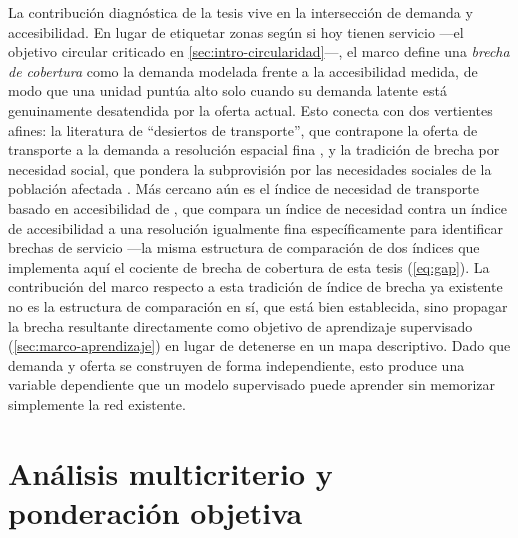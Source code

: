 La contribución diagnóstica de la tesis vive en la intersección de demanda y
accesibilidad. En lugar de etiquetar zonas según si hoy tienen servicio ---el objetivo
circular criticado en \cref{sec:intro-circularidad}---, el marco define una \emph{brecha de
cobertura} como la demanda modelada frente a la accesibilidad medida, de modo que una
unidad puntúa alto solo cuando su demanda latente está genuinamente desatendida por la
oferta actual. Esto conecta con dos vertientes afines: la literatura de ``desiertos de
transporte'', que contrapone la oferta de transporte a la demanda a resolución espacial
fina \parencite{jiao2013deserts}, y la tradición de brecha por necesidad social, que
pondera la subprovisión por las necesidades sociales de la población afectada
\parencite{currie2010gaps}. Más cercano aún es el índice de necesidad de transporte basado
en accesibilidad de \textcite{almamun2011servicegaps}, que compara un índice de necesidad
contra un índice de accesibilidad a una resolución igualmente fina específicamente para
identificar brechas de servicio ---la misma estructura de comparación de dos índices que
implementa aquí el cociente de brecha de cobertura de esta tesis (\cref{eq:gap}). La
contribución del marco respecto a esta tradición de índice de brecha ya existente no es la
estructura de comparación en sí, que está bien establecida, sino propagar la brecha
resultante directamente como objetivo de aprendizaje supervisado (\cref{sec:marco-aprendizaje})
en lugar de detenerse en un mapa descriptivo. Dado que demanda y oferta se construyen de
forma independiente, esto produce una variable dependiente que un modelo supervisado puede
aprender sin memorizar simplemente la red existente.

\section{Análisis multicriterio y ponderación objetiva}
\label{sec:marco-multicriterio}

